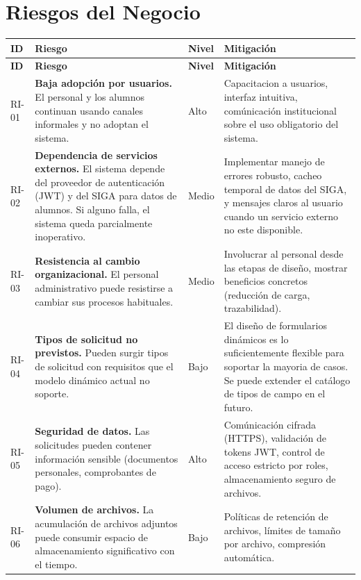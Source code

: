 \section{Riesgos del Negocio}

\begin{longtable}{|C{1.2cm}|L{5.5cm}|C{1.5cm}|L{5.5cm}|}
    \hline
    \textbf{ID} & \textbf{Riesgo} & \textbf{Nivel} & \textbf{Mitigación} \\
    \hline
    \endfirsthead
    \hline
    \textbf{ID} & \textbf{Riesgo} & \textbf{Nivel} & \textbf{Mitigación} \\
    \hline
    \endhead
    \hline
    \endfoot

    RI-01 & \textbf{Baja adopción por usuarios.} El personal y los alumnos continuan usando canales informales y no adoptan el sistema. & Alto & Capacitacion a usuarios, interfaz intuitiva, comúnicación institucional sobre el uso obligatorio del sistema. \\
    \hline
    RI-02 & \textbf{Dependencia de servicios externos.} El sistema depende del proveedor de autenticación (JWT) y del SIGA para datos de alumnos. Si alguno falla, el sistema queda parcialmente inoperativo. & Medio & Implementar manejo de errores robusto, cacheo temporal de datos del SIGA, y mensajes claros al usuario cuando un servicio externo no este disponible. \\
    \hline
    RI-03 & \textbf{Resistencia al cambio organizacional.} El personal administrativo puede resistirse a cambiar sus procesos habituales. & Medio & Involucrar al personal desde las etapas de diseño, mostrar beneficios concretos (reducción de carga, trazabilidad). \\
    \hline
    RI-04 & \textbf{Tipos de solicitud no previstos.} Pueden surgir tipos de solicitud con requisitos que el modelo dinámico actual no soporte. & Bajo & El diseño de formularios dinámicos es lo suficientemente flexible para soportar la mayoria de casos. Se puede extender el catálogo de tipos de campo en el futuro. \\
    \hline
    RI-05 & \textbf{Seguridad de datos.} Las solicitudes pueden contener información sensible (documentos personales, comprobantes de pago). & Alto & Comúnicación cifrada (HTTPS), validación de tokens JWT, control de acceso estricto por roles, almacenamiento seguro de archivos. \\
    \hline
    RI-06 & \textbf{Volumen de archivos.} La acumulación de archivos adjuntos puede consumir espacio de almacenamiento significativo con el tiempo. & Bajo & Políticas de retención de archivos, límites de tamaño por archivo, compresión automática. \\
    \hline
\end{longtable}

